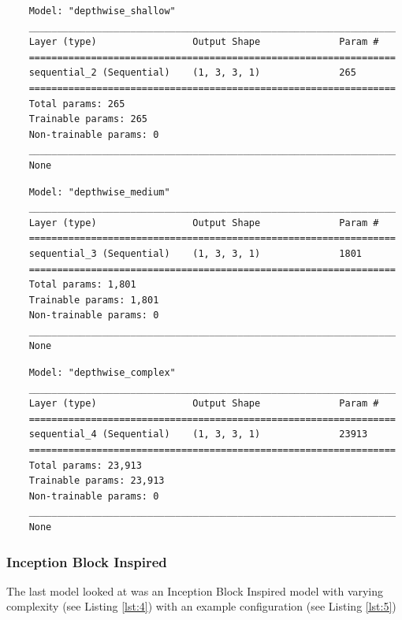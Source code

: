 \begin{verbatim}
	Model: "depthwise_shallow"
	_________________________________________________________________
	Layer (type)                 Output Shape              Param #   
	=================================================================
	sequential_2 (Sequential)    (1, 3, 3, 1)              265       
	=================================================================
	Total params: 265
	Trainable params: 265
	Non-trainable params: 0
	_________________________________________________________________
	None
\end{verbatim}

\begin{verbatim}
	Model: "depthwise_medium"
	_________________________________________________________________
	Layer (type)                 Output Shape              Param #   
	=================================================================
	sequential_3 (Sequential)    (1, 3, 3, 1)              1801      
	=================================================================
	Total params: 1,801
	Trainable params: 1,801
	Non-trainable params: 0
	_________________________________________________________________
	None
\end{verbatim}

\begin{verbatim}
	Model: "depthwise_complex"
	_________________________________________________________________
	Layer (type)                 Output Shape              Param #   
	=================================================================
	sequential_4 (Sequential)    (1, 3, 3, 1)              23913     
	=================================================================
	Total params: 23,913
	Trainable params: 23,913
	Non-trainable params: 0
	_________________________________________________________________
	None
\end{verbatim}

\subsubsection*{Inception Block Inspired}
The last model looked at was an Inception Block Inspired model with  varying complexity (see Listing \ref{lst:4}) with an example configuration (see Listing \ref{lst:5})

